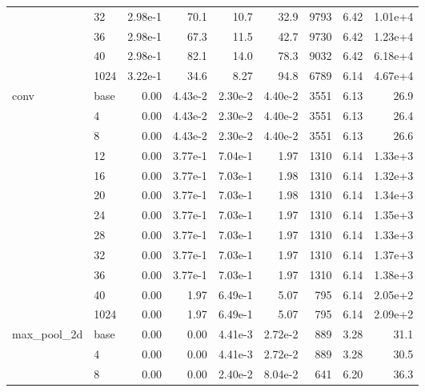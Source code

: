 \begin{longtable}{llrrrrrrr}
\cmidrule{2-9}
         & 32   &   2.98e-1 & 70.1 & 10.7 & 32.9 &    9793 &     6.42 & 1.01e+4 \\
\cmidrule{2-9}
         & 36   &   2.98e-1 & 67.3 & 11.5 & 42.7 &    9730 &     6.42 & 1.23e+4 \\
\cmidrule{2-9}
         & 40   &   2.98e-1 & 82.1 & 14.0 & 78.3 &    9032 &     6.42 & 6.18e+4 \\
\cmidrule{2-9}
         & 1024 &   3.22e-1 & 34.6 & 8.27 & 94.8 &    6789 &     6.14 & 4.67e+4 \\
\midrule
conv & base &   0.00 & 4.43e-2 & 2.30e-2 & 4.40e-2 &    3551 &     6.13 & 26.9 \\
\cmidrule{2-9}
         & 4    &   0.00 & 4.43e-2 & 2.30e-2 & 4.40e-2 &    3551 &     6.13 & 26.4 \\
\cmidrule{2-9}
         & 8    &   0.00 & 4.43e-2 & 2.30e-2 & 4.40e-2 &    3551 &     6.13 & 26.6 \\
\cmidrule{2-9}
         & 12   &   0.00 & 3.77e-1 & 7.04e-1 & 1.97 &    1310 &     6.14 & 1.33e+3 \\
\cmidrule{2-9}
         & 16   &   0.00 & 3.77e-1 & 7.03e-1 & 1.98 &    1310 &     6.14 & 1.32e+3 \\
\cmidrule{2-9}
         & 20   &   0.00 & 3.77e-1 & 7.03e-1 & 1.98 &    1310 &     6.14 & 1.34e+3 \\
\cmidrule{2-9}
         & 24   &   0.00 & 3.77e-1 & 7.03e-1 & 1.97 &    1310 &     6.14 & 1.35e+3 \\
\cmidrule{2-9}
         & 28   &   0.00 & 3.77e-1 & 7.03e-1 & 1.97 &    1310 &     6.14 & 1.33e+3 \\
\cmidrule{2-9}
         & 32   &   0.00 & 3.77e-1 & 7.03e-1 & 1.97 &    1310 &     6.14 & 1.37e+3 \\
\cmidrule{2-9}
         & 36   &   0.00 & 3.77e-1 & 7.03e-1 & 1.97 &    1310 &     6.14 & 1.38e+3 \\
\cmidrule{2-9}
         & 40   &   0.00 & 1.97 & 6.49e-1 & 5.07 &     795 &     6.14 & 2.05e+2 \\
\cmidrule{2-9}
         & 1024 &   0.00 & 1.97 & 6.49e-1 & 5.07 &     795 &     6.14 & 2.09e+2 \\
\midrule
max\_pool\_2d & base &   0.00 & 0.00 & 4.41e-3 & 2.72e-2 &     889 &     3.28 & 31.1 \\
         & 4    &   0.00 & 0.00 & 4.41e-3 & 2.72e-2 &     889 &     3.28 & 30.5 \\
\cmidrule{2-9}
         & 8    &   0.00 & 0.00 & 2.40e-2 & 8.04e-2 &     641 &     6.20 & 36.3 \\

\end{longtable}
